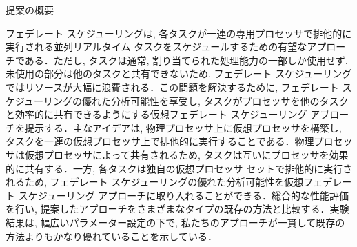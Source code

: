 
\begin{frame}{提案の概要}
    \item フェデレート スケジューリングは, 各タスクが一連の専用プロセッサで排他的に実行される並列リアルタイム タスクをスケジュールするための有望なアプローチである．ただし, タスクは通常, 割り当てられた処理能力の一部しか使用せず, 未使用の部分は他のタスクと共有できないため, フェデレート スケジューリングではリソースが大幅に浪費される．この問題を解決するために, フェデレート スケジューリングの優れた分析可能性を享受し, タスクがプロセッサを他のタスクと効率的に共有できるようにする仮想フェデレート スケジューリング アプローチを提示する．主なアイデアは, 物理プロセッサ上に仮想プロセッサを構築し, タスクを一連の仮想プロセッサ上で排他的に実行することである．物理プロセッサは仮想プロセッサによって共有されるため, タスクは互いにプロセッサを効果的に共有する．一方, 各タスクは独自の仮想プロセッサ セットで排他的に実行されるため, フェデレート スケジューリングの優れた分析可能性を仮想フェデレート スケジューリング アプローチに取り入れることができる．総合的な性能評価を行い, 提案したアプローチをさまざまなタイプの既存の方法と比較する．実験結果は, 幅広いパラメーター設定の下で, 私たちのアプローチが一貫して既存の方法よりもかなり優れていることを示している．
\end{frame}
